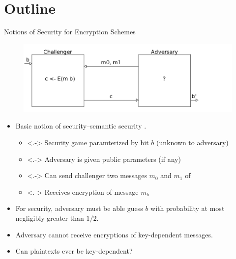 \section*{Outline}
\begin{frame}{Notions of Security for Encryption Schemes}
\begin{figure}
\includegraphics[width=.85\textwidth]{ss.png}
\end{figure}
\begin{itemize}
\item<+-> Basic notion of security--\alert{semantic security} .
\begin{itemize}
\item<.-> Security game paramterized by bit $b$ (unknown to adversary)
\item<.-> Adversary is given public parameters (if any)
\item<.-> Can send challenger two messages $m_0$ and $m_1$ of 
\item<.-> Receives encryption of message $m_b$
\end{itemize}
\item<+-> For security, adversary must be able guess $b$ with probability at most negligibly greater than $1/2$.
\item<+-> Adversary cannot receive encryptions of key-dependent messages. 
\item<+-> Can plaintexts ever be key-dependent? 
\end{itemize}
\end{frame}
